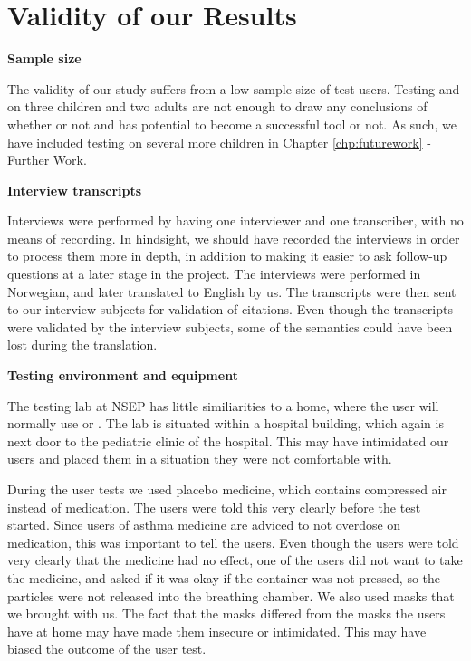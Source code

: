 \section{Validity of our Results}
\label{sec:validity}

\textbf{Sample size}

The validity of our study suffers from a low sample size of test users. Testing \ab{} and \app{} on three children and two adults are not enough to draw any conclusions of whether or not \app{} and \ab{} has potential to become a successful tool or not. As such, we have included testing on several more children in Chapter \ref{chp:futurework} - Further Work.    

\textbf{Interview transcripts}

Interviews were performed by having one interviewer and one transcriber, with no means of recording. In hindsight, we should have recorded the interviews in order to process them more in depth, in addition to making it easier to ask follow-up questions at a later stage in the project. The interviews were performed in Norwegian, and later translated to English by us. The transcripts were then sent to our interview subjects for validation of citations. Even though the transcripts were validated by the interview subjects, some of the semantics could have been lost during the translation. 


\textbf{Testing environment and equipment}

The testing lab at NSEP has little similiarities to a home, where the user will normally use \ab{} or \app{}. The lab is situated within a hospital building, which again is next door to the pediatric clinic of the hospital. This may have intimidated our users and placed them in a situation they were not comfortable with. 

During the user tests we used placebo medicine, which contains compressed air instead of medication. The users were told this very clearly before the test started. Since users of asthma medicine are adviced to not overdose on medication, this was important to tell the users. Even though the users were told very clearly that the medicine had no effect, one of the users did not want to take the medicine, and asked if it was okay if the container was not pressed, so the particles were not released into the breathing chamber. 
We also used masks that we brought with us. The fact that the masks differed from the masks the users have at home may have made them insecure or intimidated. This may have biased the outcome of the user test. 

